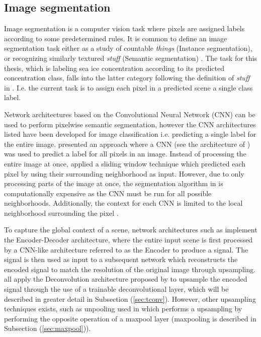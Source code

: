 \documentclass[../main/thesis.tex]{subfiles}
\begin{document}
\subsection{Image segmentation}
\label{sec:image-segmentation}
Image segmentation is a computer vision task where pixels are assigned labels according to some predetermined rules. It is common to define an image segmentation task either as a study of countable \textit{things} (Instance segmentation), or recognizing similarly textured \textit{stuff} (Semantic segmentation) \citep{Kirillov2018}. The task for this thesis, which is labeling sea ice concentration according to its predicted concentration class, falls into the latter category following the definition of \textit{stuff} in \citet{Adelson2001}. I.e. the current task is to assign each pixel in a predicted scene a single class label.

Network architectures based on the Convolutional Neural Network (CNN) \citep{LeCun1989,Ciresan2012,Krizhevsky2012,Simonyan2014,Szegedy2014,He2015a,Huang2016} can be used to perform pixelwise semantic segmentation, however the CNN architectures listed have been developed for image classification i.e. predicting a single label for the entire image. \citet{Ciresan2012a} presented an approach where a CNN (see the architecture of \citet{Ciresan2012}) was used to predict a label for all pixels in an image. Instead of processing the entire image at once, \citet{Ciresan2012a} applied a sliding window technique which predicted each pixel by using their surrounding neighborhood as input. However, due to only processing parts of the image at once, the segmentation algorithm in \citet{Ciresan2012a} is computationally expensive as the CNN must be run for all possible neighborhoods. Additionally, the context for each CNN is limited to the local neighborhood surrounding the pixel \citep{Ronneberger2015}.

To capture the global context of a scene, network architectures such as \citet{Long2015,Noh2015,Ronneberger2015,Badrinarayanan2017,Chen2018} implement the Encoder-Decoder architecture, where the entire input scene is first processed by a CNN-like architecture referred to as the Encoder to produce a signal. The signal is then used as input to a subsequent network which reconstructs the encoded signal to match the resolution of the original image through upsampling. \citet{Long2015,Ronneberger2015,Badrinarayanan2017} all apply the Deconvolution architecture proposed by \citet{Zeiler2010} to upsample the encoded signal through the use of a trainable deconvolutional layer, which will be described in greater detail in Subsection (\ref{sec:tconv}). However, other upsampling techniques exists, such as unpooling used in \citet{Noh2015} which performs a upsampling by performing the opposite operation of a maxpool layer (maxpooling is described in Subsection (\ref{sec:maxpool})).
\end{document}
